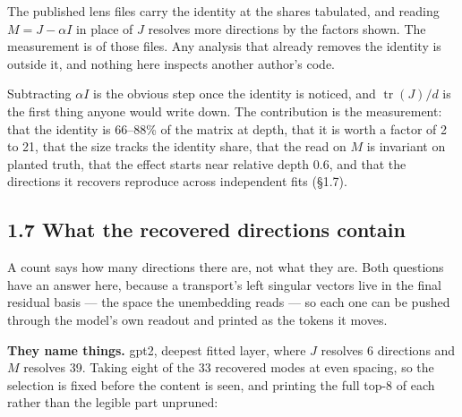 \documentclass[10pt,letterpaper,twocolumn]{article}
\begin{document}
The published lens files carry the identity at the shares tabulated, and reading \(M=J-\alpha I\) in
place of \(J\) resolves more directions by the factors shown. The measurement is of those files. Any
analysis that already removes the identity is outside it, and nothing here inspects another
author's code.

Subtracting \(\alpha I\) is the obvious step once the identity is noticed, and
\(\operatorname{tr}(J)/d\) is the first thing anyone would write down. The contribution is the
measurement: that the identity is 66--88\% of the matrix at depth, that it is worth a factor of 2 to
21, that the size tracks the identity share, that the read on \(M\) is invariant on planted truth,
that the effect starts near relative depth 0.6, and that the directions it recovers reproduce
across independent fits (§1.7).

\subsection{1.7 What the recovered directions contain}\label{17-what-the-recovered-directions-contain}

A count says how many directions there are, not what they are. Both questions have an answer here,
because a transport's left singular vectors live in the final residual basis --- the space the
unembedding reads --- so each one can be pushed through the model's own readout and printed as the
tokens it moves.

\textbf{They name things.} gpt2, deepest fitted layer, where \(J\) resolves 6 directions and \(M\) resolves
39. Taking eight of the 33 recovered modes at even spacing, so the selection is fixed before the
content is seen, and printing the full top-8 of each rather than the legible part
unpruned:
\end{document}
